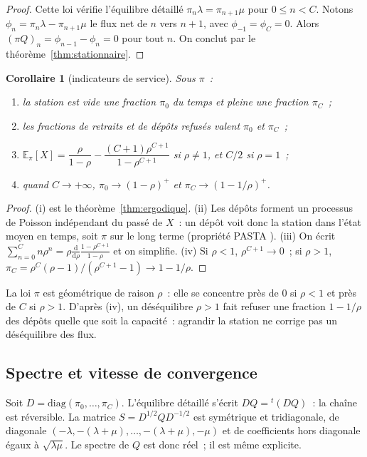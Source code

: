 \documentclass[10pt,a4paper,twocolumn]{article}
\theoremstyle{enonce}
\newtheorem{corollaire}[theoreme]{Corollaire}
\theoremstyle{defi}
\newcommand{\EE}{\mathbb{E}}
\newcommand{\dd}{\mathrm{d}}
\begin{document}
\begin{proof}
Cette loi vérifie l'équilibre détaillé $\pi_n\lambda=\pi_{n+1}\mu$ pour $0\leq n<C$. Notons $\phi_n=\pi_n\lambda-\pi_{n+1}\mu$ le flux net de $n$ vers $n+1$, avec $\phi_{-1}=\phi_C=0$. Alors $(\pi Q)_n=\phi_{n-1}-\phi_n=0$ pour tout $n$. On conclut par le théorème~\ref{thm:stationnaire}.
\end{proof}

\begin{corollaire}[indicateurs de service]\label{cor:indicateurs}
Sous $\pi$~:
\begin{enumerate}[label=(\roman*)]
\item la station est vide une fraction $\pi_0$ du temps et pleine une fraction $\pi_C$~;
\item les fractions de retraits et de dépôts refusés valent $\pi_0$ et $\pi_C$~;
\item $\EE_\pi[X]=\dfrac{\rho}{1-\rho}-\dfrac{(C+1)\rho^{C+1}}{1-\rho^{C+1}}$ si $\rho\neq1$, et $C/2$ si $\rho=1$~;
\item quand $C\to+\infty$, $\pi_0\to(1-\rho)^+$ et $\pi_C\to(1-1/\rho)^+$.
\end{enumerate}
\end{corollaire}

\begin{proof}
(i) est le théorème~\ref{thm:ergodique}. (ii) Les dépôts forment un processus de Poisson indépendant du passé de $X$~: un dépôt voit donc la station dans l'état moyen en temps, soit $\pi$ sur le long terme (propriété PASTA \cite{Wol82}). (iii) On écrit $\sum_{n=0}^Cn\rho^n=\rho\frac{\dd}{\dd\rho}\frac{1-\rho^{C+1}}{1-\rho}$ et on simplifie. (iv) Si $\rho<1$, $\rho^{C+1}\to0$~; si $\rho>1$, $\pi_C=\rho^C(\rho-1)/(\rho^{C+1}-1)\to1-1/\rho$.
\end{proof}

La loi $\pi$ est géométrique de raison $\rho$~: elle se concentre près de $0$ si $\rho<1$ et près de $C$ si $\rho>1$. D'après (iv), un déséquilibre $\rho>1$ fait refuser une fraction $1-1/\rho$ des dépôts quelle que soit la capacité~: agrandir la station ne corrige pas un déséquilibre des flux.

\subsection{Spectre et vitesse de convergence}\label{sec:spectre}

Soit $D=\mathrm{diag}(\pi_0,\dots,\pi_C)$. L'équilibre détaillé s'écrit $DQ={}^t(DQ)$~: la chaîne est réversible. La matrice $S=D^{1/2}QD^{-1/2}$ est symétrique et tridiagonale, de diagonale $(-\lambda,-(\lambda+\mu),\dots,-(\lambda+\mu),-\mu)$ et de coefficients hors diagonale égaux à $\sqrt{\lambda\mu}$. Le spectre de $Q$ est donc réel~; il est même explicite.
\end{document}

